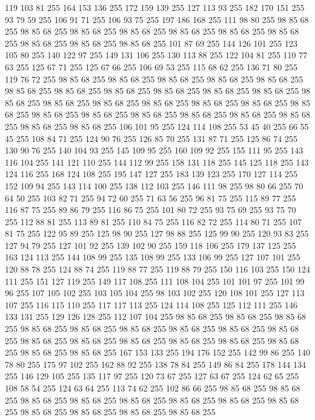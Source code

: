 119 103 81 255 164 153 136 255 172 159 139 255 127 113 93 255 182 170 151 255 93 79 59 255 106 91 71 255 106 93 75 255 197 186 168 255 111 98 80 255 98 85 68 255 98 85 68 255 98 85 68 255 98 85 68 255 98 85 68 255 98 85 68 255 98 85 68 255 98 85 68 255 98 85 68 255 98 85 68 255 101 87 69 255 144 126 101 255 123 105 80 255 140 122 97 255 149 131 106 255 130 113 88 255 122 104 81 255 110 77 63 255 125 67 71 255 125 67 66 255 106 69 53 255 115 68 62 255 136 71 80 255 119 76 72 255 98 85 68 255 98 85 68 255 98 85 68 255 98 85 68 255 98 85 68 255 98 85 68 255 98 85 68 255 98 85 68 255 98 85 68 255 98 85 68 255 98 85 68 255 98 85 68 255 98 85 68 255 98 85 68 255 98 85 68 255 98 85 68 255 98 85 68 255 98 85 68 255 98 85 68 255 98 85 68 255 98 85 68 255 98 85 68 255 98 85 68 255 98 85 68 255 98 85 68 255 98 85 68 255 106 101 95 255 124 114 108 255 53 45 40 255 66 55 45 255
108 84 71 255 124 90 76 255 126 85 70 255 131 87 71 255 125 86 74 255 130 90 76 255 140 104 93 255 145 109 95 255 160 109 92 255 155 111 95 255 143 116 104 255 141 121 110 255 144 112 99 255 158 131 118 255 145 125 118 255 143 124 116 255 168 124 108 255 195 147 127 255 183 139 123 255 170 127 114 255 152 109 94 255 143 114 100 255 138 112 103 255 146 111 98 255 98 80 66 255 70 64 50 255 103 82 71 255 94 72 60 255 71 63 56 255 96 81 75 255 115 89 77 255 116 87 75 255 89 86 79 255 116 86 75 255 101 80 72 255 93 75 69 255 93 75 70 255 112 88 81 255 113 89 81 255 110 84 75 255 116 82 72 255 114 80 71 255 107 81 75 255 122 95 89 255 125 98 90 255 127 98 88 255 125 99 90 255 120 93 83 255 127 94 79 255 127 101 92 255 139 102 90 255 159 118 106 255 179 137 125 255 163 124 113 255 144 108 99 255 135 108 99 255 133 106 99 255 127 107 101 255 120 88 78 255 124 88 74 255 119 88 77 255 119 88 79 255 150 116 103 255 150 124 111 255
151 127 119 255 149 117 108 255 111 108 104 255 101 101 97 255 101 99 96 255 107 105 102 255 103 105 104 255 98 103 102 255 120 108 101 255 127 113 107 255 116 115 110 255 117 117 113 255 124 114 108 255 125 112 111 255 146 133 131 255 129 126 128 255 112 107 104 255 98 85 68 255 98 85 68 255 98 85 68 255 98 85 68 255 98 85 68 255 98 85 68 255 98 85 68 255 98 85 68 255 98 85 68 255 98 85 68 255 98 85 68 255 98 85 68 255 98 85 68 255 98 85 68 255 98 85 68 255 98 85 68 255 98 85 68 255 167 153 133 255 194 176 152 255 142 99 86 255 140 78 80 255 175 97 102 255 162 88 92 255 138 78 84 255 149 86 84 255 178 144 134 255 146 129 105 255 135 117 97 255 120 73 67 255 127 63 67 255 124 62 65 255 108 58 54 255 124 63 64 255 113 74 62 255 102 86 66 255 98 85 68 255 98 85 68 255 98 85 68 255 98 85 68 255 98 85 68 255 98 85 68 255 98 85 68 255 98 85 68 255 98 85 68 255 98 85 68 255 98 85 68 255 98 85 68 255
